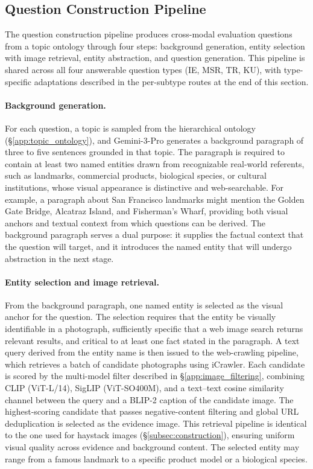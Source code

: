 \documentclass{llmxive}
\begin{document}
\subsection{Question Construction Pipeline}
\label{app:abstraction}

The question construction pipeline produces cross-modal evaluation questions from a topic ontology through four steps: background generation, entity selection with image retrieval, entity abstraction, and question generation. This pipeline is shared across all four answerable question types (IE, MSR, TR, KU), with type-specific adaptations described in the per-subtype routes at the end of this section.

\paragraph{Background generation.}
For each question, a topic is sampled from the hierarchical ontology (\S\ref{app:topic_ontology}), and Gemini-3-Pro generates a background paragraph of three to five sentences grounded in that topic. The paragraph is required to contain at least two named entities drawn from recognizable real-world referents, such as landmarks, commercial products, biological species, or cultural institutions, whose visual appearance is distinctive and web-searchable. For example, a paragraph about San Francisco landmarks might mention the Golden Gate Bridge, Alcatraz Island, and Fisherman's Wharf, providing both visual anchors and textual context from which questions can be derived. The background paragraph serves a dual purpose: it supplies the factual context that the question will target, and it introduces the named entity that will undergo abstraction in the next stage.

\paragraph{Entity selection and image retrieval.}
From the background paragraph, one named entity is selected as the visual anchor for the question. The selection requires that the entity be visually identifiable in a photograph, sufficiently specific that a web image search returns relevant results, and critical to at least one fact stated in the paragraph. A text query derived from the entity name is then issued to the web-crawling pipeline, which retrieves a batch of candidate photographs using iCrawler. Each candidate is scored by the multi-model filter described in \S\ref{app:image_filtering}, combining CLIP (ViT-L/14), SigLIP (ViT-SO400M), and a text--text cosine similarity channel between the query and a BLIP-2 caption of the candidate image. The highest-scoring candidate that passes negative-content filtering and global URL deduplication is selected as the evidence image. This retrieval pipeline is identical to the one used for haystack images (\S\ref{subsec:construction}), ensuring uniform visual quality across evidence and background content. The selected entity may range from a famous landmark to a specific product model or a biological species.
\end{document}
